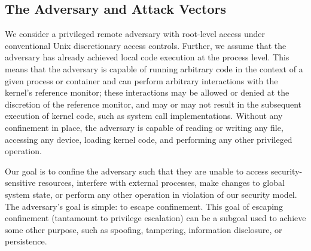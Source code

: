 
\subsection{The Adversary and Attack Vectors}

We consider a privileged remote adversary with root-level access under conventional Unix
discretionary access controls.  Further, we assume that the adversary has already achieved
local code execution at the process level. This means that the adversary is capable of
running arbitrary code in the context of a given process or container and can perform
arbitrary interactions with the kernel's reference monitor; these interactions may be
allowed or denied at the discretion of the reference monitor, and may or may not result in
the subsequent execution of kernel code, such as system call implementations. Without any
confinement in place, the adversary is capable of reading or writing any file, accessing
any device, loading kernel code, and performing any other privileged operation.

Our goal is to confine the adversary such that they are unable to access
security-sensitive resources, interfere with external processes, make changes to global
system state, or perform any other operation in violation of our security model.  The
adversary's goal is simple: to escape confinement. This goal of escaping confinement
(tantamount to privilege escalation) can be a subgoal used to achieve some other purpose,
such as spoofing, tampering, information disclosure, or persistence.



